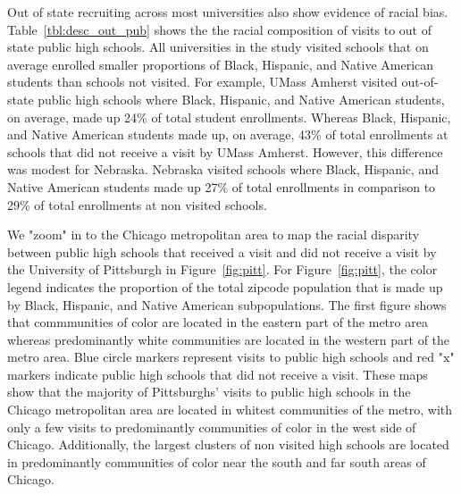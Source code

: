 \documentclass[twoside]{article}
\begin{document}



Out of state recruiting across most universities also show evidence of racial bias. Table~\ref{tbl:desc_out_pub} shows the the racial composition of visits to out of state public high schools. All universities in the study visited schools that on average enrolled smaller proportions of Black, Hispanic, and Native American students than schools not visited. For example, UMass Amherst visited out-of-state public high schools where Black, Hispanic, and Native American students, on average, made up 24\% of total student enrollments. Whereas Black, Hispanic, and Native American students made up, on average, 43\% of total enrollments at schools that did not receive a visit by UMass Amherst. However, this difference was modest for Nebraska. Nebraska visited schools where Black, Hispanic, and Native American students made up 27\% of total enrollments in comparison to 29\% of total enrollments at non visited schools.

We "zoom" in to the Chicago metropolitan area to map the racial disparity between public high schools that received a visit and did not receive a visit by the University of Pittsburgh in Figure~\ref{fig:pitt}. For Figure~\ref{fig:pitt}, the color legend indicates the proportion of the total zipcode population that is made up by Black, Hispanic, and Native American subpopulations. The first figure shows that commmunities of color are located in the eastern part of the metro area whereas predominantly white communities are located in the western part of the metro area. Blue circle markers represent visits to public high schools and red "x" markers indicate public high schools that did not receive a visit. These maps show that the majority of Pittsburghs' visits to public high schools in the Chicago metropolitan area are located in whitest communities of the metro, with only a few visits to predominantly communities of color in the west side of Chicago. Additionally, the largest clusters of non visited high schools are located in predominantly communities of color near the south and far south areas of Chicago.
\end{document}
